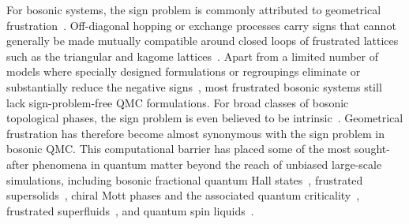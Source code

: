 \documentclass[twocolumn,aps,prl,amsmath,amssymb,superscriptaddress,longbibliography]{revtex4-2}
\begin{document}
For bosonic systems, the sign problem is commonly attributed to geometrical frustration~\cite{hatanoSuzuki1992,henelius2000prb}. Off-diagonal hopping or exchange processes carry signs that cannot generally be made mutually compatible around closed loops of frustrated lattices such as the triangular and kagome lattices~\cite{hatanoSuzuki1992,henelius2000prb,hen2021}. Apart from a limited number of models where specially designed formulations or regroupings eliminate or substantially reduce the negative signs~\cite{nakamura1998prb,nyfeler2008,alet2016prl,wessel2017,stapmanns2018,hangleiter2020,weber2022,weberCaciWessel2022,murotaTodo2025,Shackleton2026PRL,Herz2026arxiv}, most frustrated bosonic systems still lack sign-problem-free QMC formulations. For broad classes of bosonic topological phases, the sign problem is even believed to be intrinsic~\cite{hastings2016,ringelKovrizhin2017,golanSmithRingel2020,smithGolanRingel2020,seo2025}. Geometrical frustration has therefore become almost synonymous with the sign problem in bosonic QMC. This computational barrier has placed some of the most sought-after phenomena in quantum matter beyond the reach of unbiased large-scale simulations, including bosonic fractional quantum Hall states~\cite{sorensen2005prl,wang2011prl,leonard2023}, frustrated supersolids~\cite{wang2009prl,gallegos2025}, chiral Mott phases and the associated quantum criticality~\cite{dhar2013,zaletel2014prb,baldelli2024}, frustrated superfluids~\cite{you2012prl,jiangFuXu2012,burba2026}, and quantum spin liquids~\cite{yan2011science,zhu2015prb,zhou2017rmp,balents2010,gallegos2025}.
\end{document}
